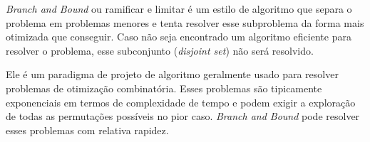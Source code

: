 \emph{Branch and Bound} ou ramificar e limitar é um estilo de algoritmo
que separa o problema em problemas menores e tenta resolver esse 
subproblema da forma mais otimizada que conseguir. Caso não
seja encontrado um algoritmo eficiente para resolver o problema, 
esse subconjunto (\emph{disjoint set}\cite{DisjointSet}) não será resolvido.

Ele é um paradigma de projeto de algoritmo geralmente usado para resolver problemas de otimização combinatória. 
Esses problemas são tipicamente exponenciais em termos de complexidade de tempo e podem exigir a exploração de todas as permutações possíveis no pior caso. 
\emph{Branch and Bound} pode resolver esses problemas com relativa rapidez.